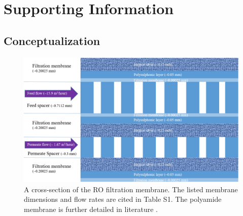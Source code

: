 


\section{\huge \textbf{Supporting Information}}

\beginsupplement

\subsection{Conceptualization}

\begin{figure}[h]
    \centering
    \includegraphics[width = \textwidth]{images/ROSSpy/supporting_information/membrane_scheme_3.PNG}
    \caption{
        A cross-section of the RO filtration membrane. The listed membrane dimensions and flow rates are cited in Table S1. The polyamide membrane is further detailed in literature \cite{Strubbe2018CalibrationFull-Scale}. 
    }
    \label{membrane_scheme}
\end{figure}

